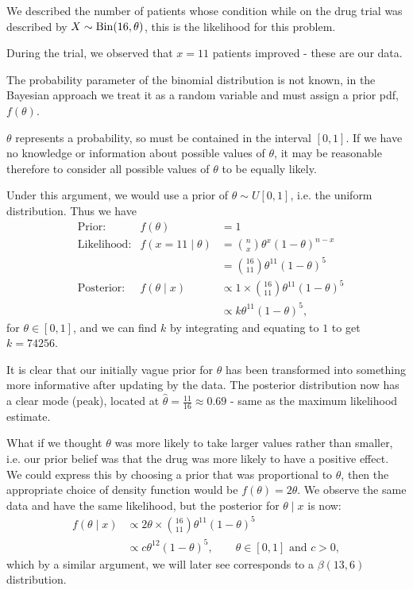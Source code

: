 \documentclass[10pt, a4paper]{article}
\begin{document}
\begin{example}
    We described the number of patients whose condition while on the drug trial was described by $X \sim \operatorname{Bin}(16, \theta)$,
    this is the likelihood for this problem.

    During the trial,
    we observed that $x = 11$ patients improved -
    these are our data.

    The probability parameter of the binomial distribution is not known,
    in the Bayesian approach we treat it as a random variable and must assign a prior pdf,
    $f(\theta)$.

    $\theta$ represents a probability,
    so must be contained in the interval $[0, 1]$.
    If we have no knowledge or information about possible values of $\theta$,
    it may be reasonable therefore to consider all possible values of $\theta$ to be equally likely.

    Under this argument,
    we would use a prior of $\theta \sim U[0, 1]$,
    i.e. the uniform distribution.
    Thus we have
    \begin{align*}
        &\text{Prior:} & f(\theta) &= 1 \\
        &\text{Likelihood:} & f(x = 11\mid \theta) &= \binom{n}{x}\theta ^ x(1 - \theta) ^ {n - x} \\
        && &= \binom{16}{11}\theta ^ {11}(1 - \theta) ^ 5 \\
        &\text{Posterior:} & f(\theta \mid x) &\propto 1 \times \binom{16}{11}\theta ^ {11}(1 - \theta) ^ 5 \\
        && &\propto k\theta ^ {11}(1 - \theta) ^ 5,
    \end{align*}
    for $\theta \in [0, 1]$,
    and we can find $k$ by integrating and equating to $1$ to get $k = 74256$.

    It is clear that our initially vague prior for $\theta$ has been transformed into something more informative after updating by the data.
    The posterior distribution now has a clear mode
    (peak),
    located at $\hat{\theta} = \frac{11}{16} \approx 0.69$ -
    same as the maximum likelihood estimate.

    What if we thought $\theta$ was more likely to take larger values rather than smaller,
    i.e. our prior belief was that the drug was more likely to have a positive effect.
    We could express this by choosing a prior that was proportional to $\theta$,
    then the appropriate choice of density function would be $f(\theta) = 2\theta$.
    We observe the same data and have the same likelihood,
    but the posterior for $\theta\mid x$ is now:
    \begin{align*}
        f(\theta \mid x) &\propto 2\theta \times \binom{16}{11}\theta ^ {11}(1 - \theta) ^ 5 \\
        &\propto c\theta ^ {12}(1 - \theta) ^ 5,\qquad\theta \in [0, 1]\text{ and } c > 0,
    \end{align*}
    which by a similar argument,
    we will later see corresponds to a $\beta(13, 6)$ distribution.
\end{example}
\end{document}
